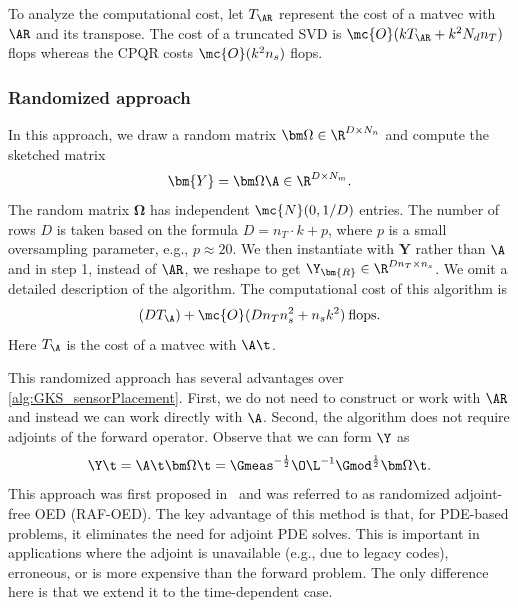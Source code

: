 \documentclass{aims} %
\theoremstyle{definition}
\begin{document}
To analyze the computational cost, let  $T_{\AR}$ represent the cost of a matvec with $\AR$ and its transpose. The cost of a truncated SVD is $\mc{O}(kT_{\AR} + k^2N_dn_T)$ flops whereas the CPQR costs $\mc{O}(k^2n_s)$ flops. 



\subsubsection*{Randomized approach} In this approach, we draw a random matrix $\bm\Omega \in \R^{D\times N_n}$ and compute the sketched matrix 
\begin{align} \label{eq:Rand_sensor_selection}
\bm{Y} = \bm\Omega \A \in \R^{D\times N_m}. 
\end{align}
The random matrix $\bm\Omega$ has 
independent $\mc{N}(0,1/D)$ entries. The number of rows $D$ is taken based on the formula $D = n_T\cdot k + p$, where $p$ is a small oversampling parameter, e.g., $p \approx 20$. We then instantiate  with $\bm{Y}$ rather than $\A$ and in step 1, instead of $\AR$, we reshape to get $\Y_{\bm{R}} \in \R^{Dn_T \times n_s}$. We omit a detailed description of the algorithm.  The computational cost of this algorithm is \[(DT_{\A}) + \mc{O}(Dn_T n_s^2 + n_sk^2)  \> \text{flops}.  \] 
Here $T_{\A}$ is the cost of a matvec with $\A\t$.




This randomized approach has several advantages  over \cref{alg:GKS_sensorPlacement}. First, we do not need to construct or work with $\AR$ and instead we can work directly with $\A$. Second, the algorithm does not require adjoints of the forward operator. Observe that we can form $\Y$ as 
\[ \Y\t = \A\t \bm\Omega\t = \Gmeas^{-\frac 12}\O\L^{-1} \Gmod^{\frac 12}\bm\Omega\t. \]
This approach was first proposed in~\cite{eswar2024bayesian} and was referred to as randomized adjoint-free OED (RAF-OED). The key advantage of this method is that, for PDE-based problems, it eliminates the need for adjoint PDE solves. This is important in applications where the adjoint is unavailable (e.g., due to legacy codes), erroneous, or is more expensive than the forward problem. The only difference here is that we extend it to the time-dependent case.
\end{document}
